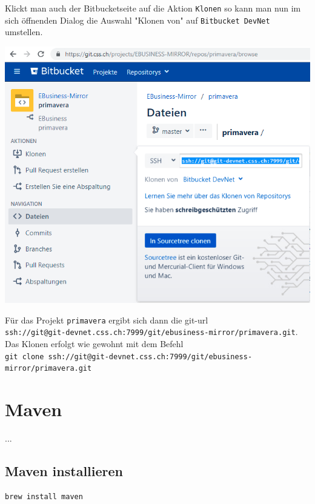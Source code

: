 \documentclass[]{article}
\newcommand{\code}[1]{\texttt{#1}}
\begin{document}
Klickt man auch der Bitbucketseite auf die Aktion \code{Klonen} so kann man nun im sich öffnenden Dialog die Auswahl "Klonen von" auf \code{Bitbucket DevNet} umstellen.

\includegraphics[scale=0.3]{assets/clone.png}

Für das Projekt \code{primavera} ergibt sich dann die git-url \\
\code{ssh://git@git-devnet.css.ch:7999/git/ebusiness-mirror/primavera.git}. Das Klonen erfolgt wie gewohnt mit dem Befehl \\
\code{git clone ssh://git@git-devnet.css.ch:7999/git/ebusiness-mirror/primavera.git}

\section{Maven}
...
\subsection{Maven installieren}
\begin{verbatim}
brew install maven
\end{verbatim}
\end{document}
